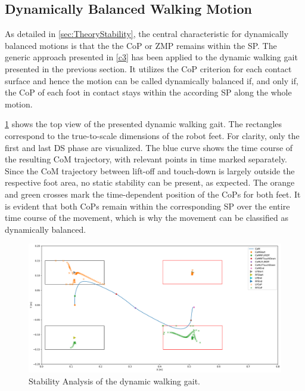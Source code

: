 \subsection{Dynamically Balanced Walking Motion}
As detailed in \cref{sec:TheoryStability}, the central characteristic for dynamically balanced motions is that the the \gls{CoP} or \gls{ZMP} remains within the \gls{SP}. The generic approach presented in \cref{c3} has been applied to the dynamic walking gait presented in the previous section. It utilizes the \gls{CoP} criterion for each contact surface and hence the motion can be called dynamically balanced if, and only if, the \gls{CoP} of each foot in contact stays within the according \gls{SP} along the whole motion. 

\cref{fig:walkDynamic_StabilityCoP100} shows the top view of the presented dynamic walking  gait. The rectangles correspond to the true-to-scale dimensions of the robot feet. For clarity, only the first and last \gls{DS} phase are visualized.  
The blue curve shows the time course of the resulting \gls{CoM} trajectory, with relevant points in time marked separately. Since the \gls{CoM} trajectory between lift-off and touch-down is largely outside the respective foot area, no static stability can be present, as expected. 
The orange and green crosses mark the time-dependent position of the \gls{CoP}s for both feet. It is evident that both \gls{CoP}s remain within the corresponding SP over the entire time course of the movement, which is why the movement can be classified as dynamically balanced. 
\begin{figure}[h!]
\centering	
\includegraphics[width=1\textwidth]{fig/walkDynamic/StabilityAnalysis_CoP100}
\caption{Stability Analysis of the dynamic walking gait.}
\label{fig:walkDynamic_StabilityCoP100}
\end{figure} 

